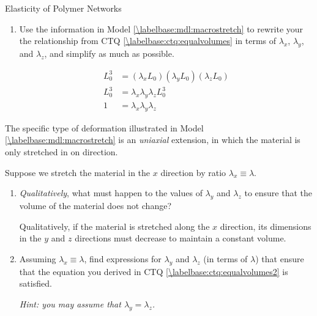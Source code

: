 \begin{activity}{Elasticity of Polymer Networks}
\begin{ctqs}
\begin{enumerate}
			\item Use the information in Model \ref{\labelbase:mdl:macrostretch} to rewrite your the relationship from CTQ \ref{\labelbase:ctq:equalvolumes} in terms of $\lambda_x$, $\lambda_y$, and $\lambda_z$, and simplify as much as possible. \label{\labelbase:ctq:equalvolumes2}
	
		\begin{solution}[1.5in]
			\begin{align*}
				L_0^3 &= (\lambda_x L_0)(\lambda_y L_0)(\lambda_z L_0) \\
				L_0^3 & = \lambda_x \lambda_y \lambda_z L_0^3 \\
				1 &= \lambda_x \lambda_y \lambda_z
			\end{align*}
		\end{solution}
		
		\end{enumerate}
		
	\question The specific type of deformation illustrated in Model \ref{\labelbase:mdl:macrostretch} is an \emph{uniaxial} extension, in which the material is only stretched in on direction.
	
		Suppose we stretch the material in the $x$ direction by ratio $\lambda_x \equiv \lambda$.  
		
			\begin{enumerate}
				\item \emph{Qualitatively}, what must happen to the values of $\lambda_y$ and $\lambda_z$ to ensure that the volume of the material does not change?
				
					\begin{solution}[1in]
						Qualitatively, if the material is stretched along the $x$ direction, its dimensions in the $y$ and $z$ directions must decrease to maintain a constant volume.
					\end{solution}
				
				\item Assuming $\lambda_x \equiv \lambda$, find expressions for $\lambda_y$ and $\lambda_z$ (in terms of $\lambda$) that ensure that the equation you derived in CTQ \ref{\labelbase:ctq:equalvolumes2} is satisfied.
		
				\emph{Hint: you may assume that $\lambda_y = \lambda_z$.}
				
					\begin{solution}[1.5in]\end{solution}
				

\end{enumerate}
\end{ctqs}
\end{activity}
